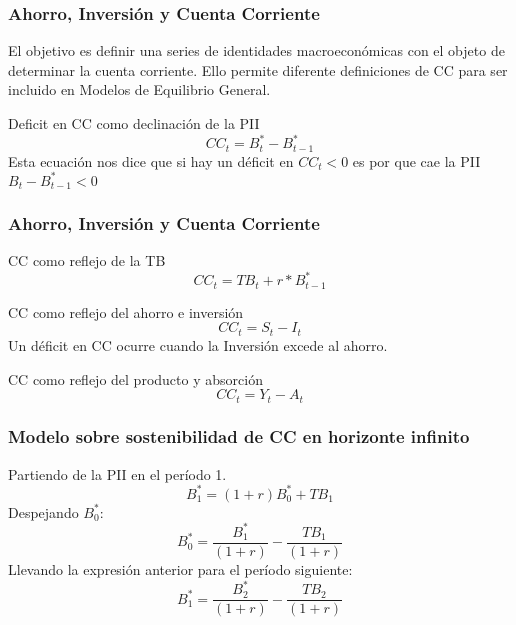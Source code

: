 \documentclass[10pt, xcolor=table, x11names]{beamer}
\begin{document}
	
	\begin{frame}[label=INTRODUCCION3]
		\frametitle{{\normalsize Ahorro, Inversión y Cuenta Corriente} {}}
		El objetivo es definir una series de identidades macroeconómicas con el objeto de determinar la cuenta corriente. Ello permite diferente definiciones de CC para ser incluido en Modelos de Equilibrio General.\\
		\begin{block} {Deficit en CC como declinación de la PII}
		\begin{equation}
		CC_{t}=B_{t}^{*}-B_{t-1}^{*}
		\end{equation}	
		Esta ecuación nos dice que si hay un déficit en $CC_{t}<0$ es por que cae la PII $B_{t}-B_{t-1}^{*}<0$	
		\end{block}		
	\end{frame}
	
\begin{frame}[label=ccperspetivas1]
\frametitle{{\normalsize Ahorro, Inversión y Cuenta Corriente} {}}
\begin{block} {CC como reflejo de la TB}
	\begin{equation}
	CC_{t}=TB_{t}+r*B_{t-1}^{*}
	\end{equation}	
\end{block}	
\begin{block} {CC como reflejo del ahorro e inversión}
	\begin{equation}
	CC_{t}=S_{t}-I_{t}
	\end{equation}	
	Un déficit en CC ocurre cuando la Inversión excede al ahorro.
\end{block}	
\begin{block} {CC como reflejo del producto y absorción}
	\begin{equation}
	CC_{t}=Y_{t}-A_{t}
	\end{equation}	
\end{block}	
\end{frame}
	
\begin{frame}
	\frametitle{{\normalsize Modelo sobre sostenibilidad de CC en horizonte infinito} {}}
	Partiendo de la PII en el período 1.
	\setcounter{equation}{0}
	\begin{equation}
	B_{1}^{*}=(1+r)B_{0}^{*}+TB_{1}
	\label{e1}
	\end{equation}	
	Despejando $B_{0}^{*}$:
	\begin{equation}
	B_{0}^{*}=\frac{B_{1}^{*}}{(1+r)}-\frac{TB_{1}}{(1+r)}
	\label{e2}
	\end{equation}	
	Llevando la expresión anterior para el período siguiente:
	\begin{equation}
	B_{1}^{*}=\frac{B_{2}^{*}}{(1+r)}-\frac{TB_{2}}{(1+r)}
	\label{e3}
	\end{equation}	
\end{frame}	
	
\end{document}
